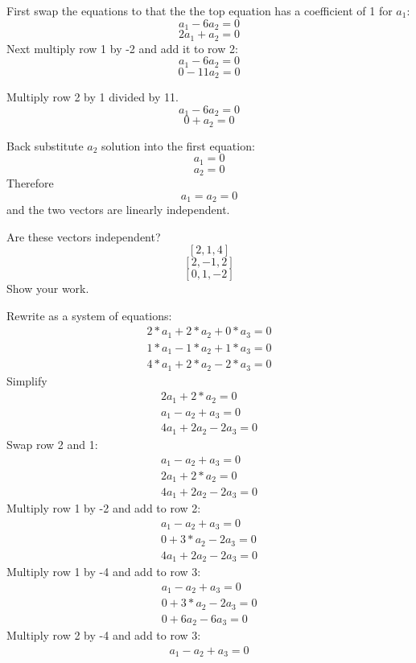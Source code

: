First swap the equations to that the the top equation has a coefficient of 1 for $a_1$:
$$a_1 - 6a_2 = 0$$ 
$$2a_1 + a_2 = 0$$ 
Next multiply row 1 by -2 and add it to row 2:
$$a_1 - 6a_2 = 0$$ 
$$0  - 11a_2 = 0$$ 

Multiply row 2 by 1 divided by 11.
$$a_1 - 6a_2 = 0$$ 
$$0  +  a_2 = 0$$ 

Back substitute $a_2$ solution into the first equation:
$$a_1  = 0$$
$$a_2 = 0$$ 
Therefore $$a_1 = a_2 = 0$$ and the two vectors are linearly independent.

\begin{Exercise}[title={Vector Independence}, label=vector_independence]
    Are these vectors independent? 
$$[2, 1, 4]$$
$$[2, -1, 2]$$ 
$$[0, 1, -2]$$
Show your work.
\end{Exercise}
\begin{Answer}[ref=vector_independence]
    Rewrite as a system of equations:
        $$\begin{matrix}
			2*a_1 +2*a_2 + 0*a_3 = 0 \\
			1*a_1 - 1*a_2 +1*a_3 = 0 \\
			4*a_1 + 2*a_2 - 2*a_3 = 0
		  \end{matrix} $$
	Simplify
		$$\begin{matrix}
			2a_1 +2*a_2  = 0 \\
			a_1 - a_2 + a_3 = 0 \\
			4a_1 + 2a_2 - 2a_3 = 0
		  \end{matrix} $$
	Swap row 2 and 1:
		$$\begin{matrix}
			a_1 - a_2 + a_3 = 0 \\
			2a_1 +2*a_2  = 0 \\
			4a_1 + 2a_2 - 2a_3 = 0
		  \end{matrix} $$
	Multiply row 1 by -2 and add to row 2:
	   $$\begin{matrix}
			a_1 - a_2 + a_3 = 0 \\
			0 +  3*a_2 -2a_3    = 0 \\
			4a_1 + 2a_2 - 2a_3 = 0
		  \end{matrix} $$
	Multiply row 1 by -4 and add to row 3:	
	    $$\begin{matrix}
			a_1 - a_2 + a_3 = 0 \\
			0 +   3*a_2 -2a_3    = 0 \\
			0   + 6a_2 - 6a_3 = 0
		  \end{matrix} $$
	Multiply row 2 by -4 and add to row 3:
	   $$\begin{matrix}
			a_1 - a_2 + a_3 = 0 \\

\end{matrix}$$
\end{Answer}
